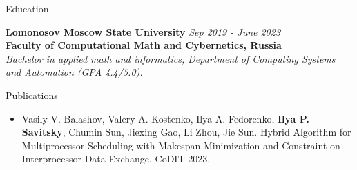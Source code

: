 \documentclass{resume} %
\begin{document}
\begin{rSection}{Education}

{\bf Lomonosov Moscow State University } \hfill {\em Sep 2019 - June 2023} \\
{\bf Faculty of Computational Math and Cybernetics, Russia}
\\{ \textit { Bachelor in applied math and informatics, Department of Computing Systems and Automation (GPA 4.4/5.0). }}

\end{rSection}

\begin{rSection}{Publications}
\begin{itemize}
    \item Vasily V. Balashov, Valery A. Kostenko, Ilya A. Fedorenko, \textbf{Ilya P. Savitsky}, Chumin Sun, Jiexing Gao, Li Zhou, Jie Sun. Hybrid Algorithm for Multiprocessor Scheduling with Makespan Minimization and Constraint on Interprocessor Data Exchange, CoDIT 2023. 
\end{itemize}
\end{rSection}
\end{document}
